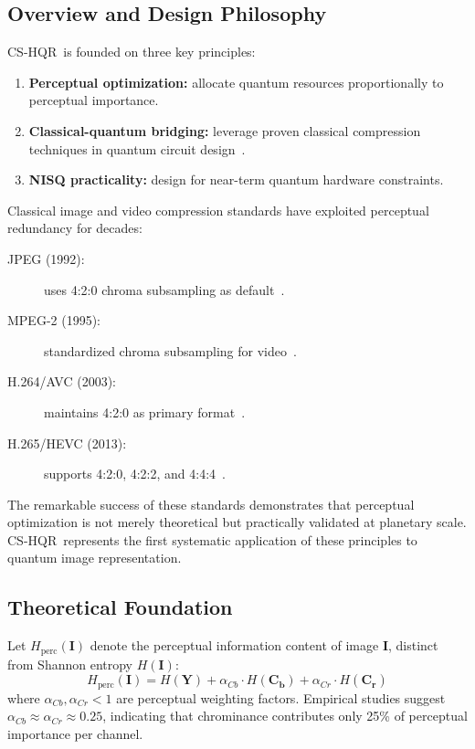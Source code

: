 \documentclass{ipol}
\newcommand{\cshqr}{\textsc{CS-HQR}}
\begin{document}
\FloatBarrier
\subsection{Overview and Design Philosophy}

\cshqr\ is founded on three key principles:
\begin{enumerate}
  \item \textbf{Perceptual optimization:} allocate quantum resources
    proportionally to perceptual importance.
  \item \textbf{Classical-quantum bridging:} leverage proven classical
    compression techniques in quantum circuit design~\cite{ref67}.
  \item \textbf{NISQ practicality:} design for near-term quantum hardware
    constraints.
\end{enumerate}

Classical image and video compression standards have exploited perceptual
redundancy for decades:
\begin{description}
  \item[JPEG (1992):] uses 4:2:0 chroma subsampling as default~\cite{ref37}.
  \item[MPEG-2 (1995):] standardized chroma subsampling for video~\cite{ref36}.
  \item[H.264/AVC (2003):] maintains 4:2:0 as primary format~\cite{ref22}.
  \item[H.265/HEVC (2013):] supports 4:2:0, 4:2:2, and 4:4:4~\cite{ref55}.
\end{description}

The remarkable success of these standards demonstrates that perceptual
optimization is not merely theoretical but practically validated at planetary
scale. \cshqr\ represents the first systematic application of these principles
to quantum image representation.

\FloatBarrier
\subsection{Theoretical Foundation}

Let $H_{\text{perc}}(\mathbf{I})$ denote the perceptual information content
of image $\mathbf{I}$, distinct from Shannon entropy $H(\mathbf{I})$:
\begin{equation}
H_{\text{perc}}(\mathbf{I}) = H(\mathbf{Y}) + \alpha_{Cb} \cdot H(\mathbf{C_b})
  + \alpha_{Cr} \cdot H(\mathbf{C_r})
\label{eq:perceptual_entropy}
\end{equation}
where $\alpha_{Cb}, \alpha_{Cr} < 1$ are perceptual weighting factors.
Empirical studies suggest $\alpha_{Cb} \approx \alpha_{Cr} \approx 0.25$,
indicating that chrominance contributes only 25\% of perceptual importance
per channel.
\end{document}
